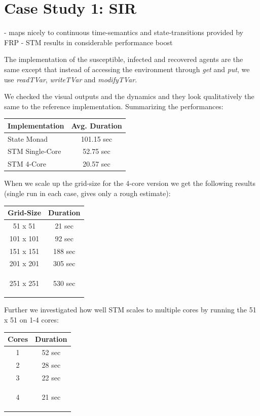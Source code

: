 \section{Case Study 1: SIR}
- maps nicely to continuous time-semantics and state-transitions provided by FRP
- STM results in considerable performance boost

The implementation of the susceptible, infected and recovered agents are the same except that instead of accessing the environment through \textit{get} and \textit{put}, we use \textit{readTVar}, \textit{writeTVar} and \textit{modifyTVar}.

We checked the visual outputs and the dynamics and they look qualitatively the same to the reference implementation. Summarizing the performances:
\begin{center}
  \begin{tabular}{ l || c }
    Implementation & Avg. Duration \\ \hline \hline 
    State Monad & 101.15 sec \\ \hline
   	STM Single-Core & 52.75 sec \\ \hline
   	STM 4-Core & 20.57 sec 
  \end{tabular}
\end{center}

When we scale up the grid-size for the 4-core version we get the following results (single run in each case, gives only a rough estimate): 
\begin{center}
  \begin{tabular}{ c || c }
    Grid-Size & Duration \\ \hline \hline 
    51 x 51 & 21 sec \\ \hline
    101 x 101 & 92 sec \\ \hline
    151 x 151 & 188 sec \\ \hline
    201 x 201 & 305 sec \\ \hline
    251 x 251 & 530 sec 
    
    \label{tab:agent_by_duration_stm}
  \end{tabular}
\end{center}

Further we investigated how well STM scales to multiple cores by running the 51 x 51 on 1-4 cores:
\begin{center}
  \begin{tabular}{ c || c }
    Cores & Duration \\ \hline \hline 
    1 & 52 sec \\ \hline
    2 & 28 sec \\ \hline
    3 & 22 sec \\ \hline
    4 & 21 sec
    
    \label{tab:cores_by_duration_stm}
  \end{tabular}
\end{center}

